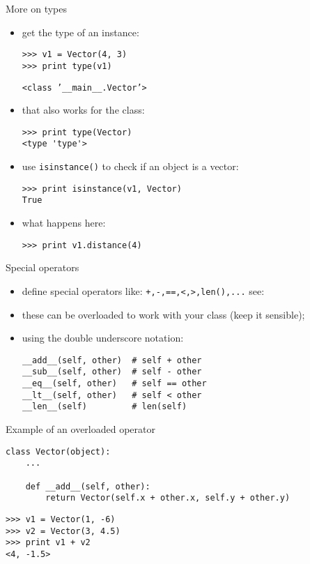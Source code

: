 \documentclass{beamer}
\begin{document}
\begin{frame}[fragile]{More on types}
\begin{itemize}
\item get the type of an instance:
\begin{verbatim}
>>> v1 = Vector(4, 3)
>>> print type(v1)
\end{verbatim}
\vspace{-.08cm}
\texttt{<class}\texttt{ '__main__.Vector'>}

\item that also works for the class:
\begin{verbatim}
>>> print type(Vector)
<type 'type'>
\end{verbatim}

\item use \texttt{isinstance()} to check if an object is a
vector:
\begin{verbatim}
>>> print isinstance(v1, Vector)
True
\end{verbatim}

\item what happens here:
\begin{verbatim}
>>> print v1.distance(4)
\end{verbatim}
\end{itemize}
\end{frame}

\begin{frame}[fragile]{Special operators}
\begin{itemize}
\item define special operators like:
\texttt{+,-,==,<,>,len(),...}
see: 

\item these can be \textcolor{pms280_compl}{overloaded} to work with your
class (keep it sensible);
\item using the double underscore notation:
\begin{verbatim}
__add__(self, other)  # self + other
__sub__(self, other)  # self - other
__eq__(self, other)   # self == other
__lt__(self, other)   # self < other
__len__(self)         # len(self)
\end{verbatim}
\end{itemize}
\end{frame}

\begin{frame}[fragile]{Example of an overloaded operator}
\begin{verbatim}
class Vector(object):
    ...

    def __add__(self, other):
        return Vector(self.x + other.x, self.y + other.y)
\end{verbatim}

\bigskip

\begin{verbatim}
>>> v1 = Vector(1, -6)
>>> v2 = Vector(3, 4.5)
>>> print v1 + v2
<4, -1.5>
\end{verbatim}
\end{frame}
\end{document}
